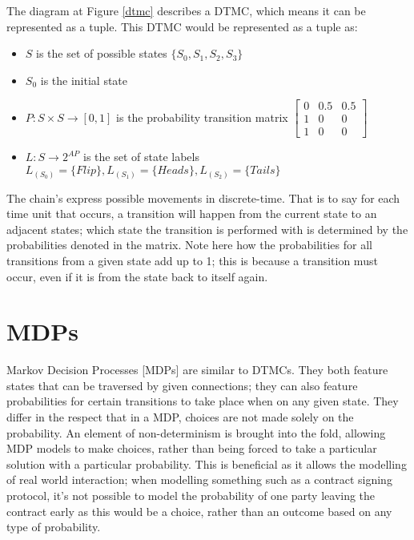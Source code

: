 \documentclass{l4proj}
\begin{document}
The diagram at Figure \ref{dtmc} describes a DTMC, which means it can be represented as a tuple. This DTMC would be represented as a tuple  as:
\begin{itemize}
\item{$S$ is the set of possible states $\lbrace S_0, S_1, S_2, S_3 \rbrace $}
\item{$S{_0}$ is the initial state}
\item{$P : S \times S \rightarrow [0,1]$ is the probability transition matrix $\begin{bmatrix}
0 & 0.5 & 0.5\\ 
1 & 0 & 0\\ 
1 & 0 & 0
\end{bmatrix}$}
\item{$L : S \rightarrow 2^{AP}$ is the set of state labels $L_{(S_0)}=\lbrace Flip \rbrace , L_{(S_1)}=\lbrace Heads \rbrace , L_{(S_2)}=\lbrace Tails \rbrace$}
\end{itemize}

The chain's express possible movements in discrete-time. That is to say for each time unit that occurs, a transition will happen from the current state to an adjacent states; which state the transition is performed with is determined by the probabilities denoted in the matrix. Note here how the probabilities for all transitions from a given state add up to 1; this is because a transition must occur, even if it is from the state back to itself again. 


\section{MDPs}


Markov Decision Processes [MDPs] \cite{puterman2009markov} are similar to DTMCs. They both feature states that can be traversed by given connections; they can also feature probabilities for certain transitions to take place when on any given state. They differ in the respect that in a MDP, choices are not made solely on the probability. An element of non-determinism is brought into the fold, allowing MDP models to make choices, rather than being forced to take a particular solution with a particular probability. This is beneficial as it allows the modelling of real world interaction; when modelling something such as a contract signing protocol, it's not possible to model the probability of one party leaving the contract early as this would be a choice, rather than an outcome based on any type of probability.
\end{document}
